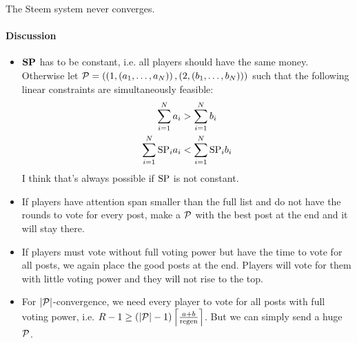 \begin{theorem}
  The Steem system never converges.
\end{theorem}

  \paragraph{Discussion}
    \begin{itemize}
      \item $\stpowvec$ has to be constant, i.e. all players should have the
      same money. Otherwise let $\postlist = \left(\left(1, \left(a_1, \dots,
      a_\playerlen\right)\right), \left(2, \left(b_1, \dots,
      b_\playerlen\right)\right)\right)$ such that the following linear
      constraints are simultaneously feasible:
      \begin{gather*}
        \sum\limits_{i=1}^\playerlen a_i > \sum\limits_{i=1}^\playerlen b_i \\
        \sum\limits_{i=1}^\playerlen \stpow_i a_i < \sum\limits_{i=1}^\playerlen
        \stpow_i  b_i \\
      \end{gather*}
      I think that's always possible if $\stpow$ is not constant.
      \item If players have attention span smaller than the full list and do not
      have the rounds to vote for every post, make a $\postlist$ with the best
      post at the end and it will stay there.
      \item If players must vote without full voting power but have the time to
      vote for all posts, we again place the good posts at the end. Players will
      vote for them with little voting power and they will not rise to the top.
      \item For $|\postlist|$-convergence, we need every player to vote for all
      posts with full voting power, i.e. $R - 1 \geq \left(|\postlist| -
      1\right) \ceil*{\frac{a + b}{\regen}}$. But we can simply send a huge
      $\postlist$.
    \end{itemize}

